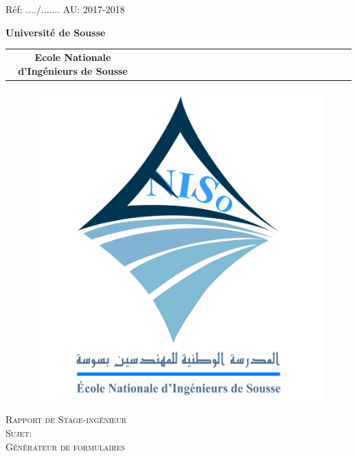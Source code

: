
\begin{titlepage}
{
\noindent Réf: ..../.......{\hfill 
         \hfill}\hfill AU: 2017-2018
\begin{center}
\vspace{-1cm}
\Huge \bfseries Université de Sousse
\setlength{\arrayrulewidth}{.2em}
\bigskip
\begin{tabular}{ccccccccccccccccccccccc}
\arrayrulecolor{blue}
\hline
\Huge \bfseries Ecole Nationale d’Ingénieurs de Sousse
\end{tabular}
\vspace{-1cm}
\begin{figure} [H]
    \centering
         \begin{center}
           \includegraphics[scale=0.1]{img/Logo_ENISo.png}
        \end{center}
\end{figure}
\vspace{-1.2cm}
\textsc{\LARGE Rapport de Stage-ingénieur}\\
\textsc{\large Sujet:}\\
\textsc{\Huge Générateur de formulaires}\\

\end{center}}
\end{titlepage}
